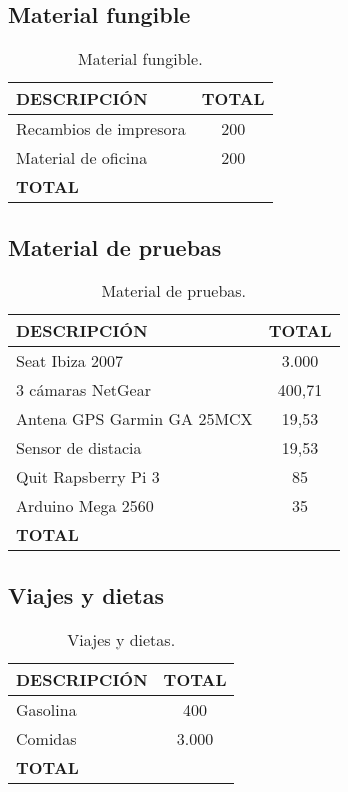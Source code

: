 \documentclass[10pt,a4paper,oldfontcommands]{dpds}
\begin{document}
\subsection{Material fungible}
\begin{table}[H]
\begin{center}
\begin{tabular}{l c}
\hline
\textbf{DESCRIPCIÓN} & \textbf{TOTAL}\\ \hline \hline
Recambios de impresora & 200\\
Material de oficina & 200\\ \hline \hline
\textbf{TOTAL} & \\ \hline
\end{tabular}
\caption{Material fungible.}
\label{tab:fungible}
\end{center}
\end{table}


\subsection{Material de pruebas}
\begin{table}[H]
\begin{center}
\begin{tabular}{l c}
\hline
\textbf{DESCRIPCIÓN} & \textbf{TOTAL}\\ \hline \hline
Seat Ibiza 2007 & 3.000\\
3 cámaras NetGear & 400,71\\
Antena GPS Garmin GA 25MCX & 19,53\\
Sensor de distacia & 19,53\\
Quit Rapsberry Pi 3 & 85\\
Arduino Mega 2560 & 35\\ \hline \hline
\textbf{TOTAL} & \\ \hline
\end{tabular}
\caption{Material de pruebas.}
\label{tab:pruebas}
\end{center}
\end{table}





\subsection{Viajes y dietas}
\begin{table}[H]
\begin{center}
\begin{tabular}{l c}
\hline
\textbf{DESCRIPCIÓN} & \textbf{TOTAL}\\ \hline \hline
Gasolina & 400\\
Comidas & 3.000\\ \hline \hline
\textbf{TOTAL} & \\ \hline
\end{tabular}
\caption{Viajes y dietas.}
\label{tab:viajes}
\end{center}
\end{table}
\end{document}
